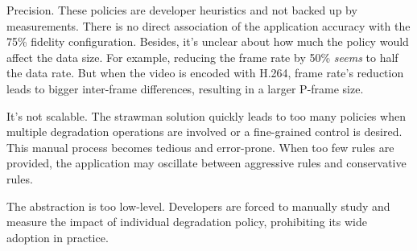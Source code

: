 Precision. These policies are developer heuristics and not backed up by
measurements. There is no direct association of the application accuracy with
the 75\% fidelity configuration. Besides, it's unclear about how much the policy
would affect the data size. For example, reducing the frame rate by 50\%
\textit{seems} to half the data rate. But when the video is encoded with H.264,
frame rate's reduction leads to bigger inter-frame differences, resulting in a
larger P-frame size.


It's not scalable. The strawman solution quickly leads to too many policies when
multiple degradation operations are involved or a fine-grained control is
desired. This manual process becomes tedious and error-prone. When too few rules
are provided, the application may oscillate between aggressive rules and
conservative rules.

The abstraction is too low-level. Developers are forced to manually study and
measure the impact of individual degradation policy, prohibiting its wide
adoption in practice.

